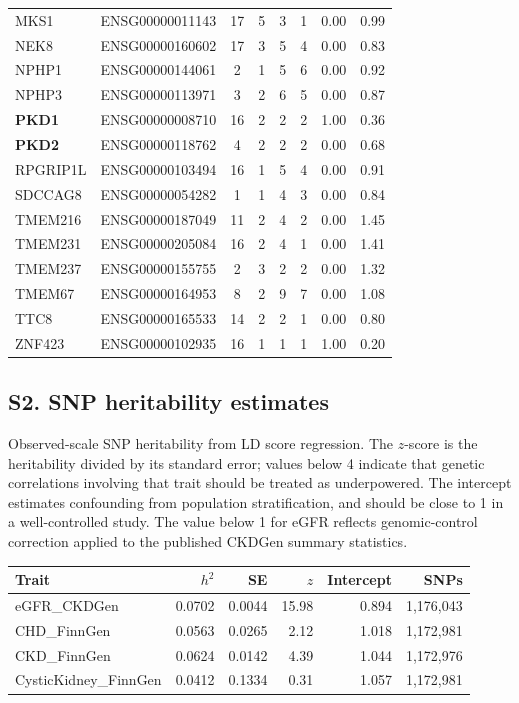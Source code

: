 \documentclass[11pt,a4paper]{article}
\begin{document}
\begin{longtable}{llccccrr}
MKS1 & ENSG00000011143 & 17 & 5 & 3 & 1 & 0.00 & 0.99 \\
NEK8 & ENSG00000160602 & 17 & 3 & 5 & 4 & 0.00 & 0.83 \\
NPHP1 & ENSG00000144061 & 2 & 1 & 5 & 6 & 0.00 & 0.92 \\
NPHP3 & ENSG00000113971 & 3 & 2 & 6 & 5 & 0.00 & 0.87 \\
\textbf{PKD1} & ENSG00000008710 & 16 & 2 & 2 & 2 & 1.00 & 0.36 \\
\textbf{PKD2} & ENSG00000118762 & 4 & 2 & 2 & 2 & 0.00 & 0.68 \\
RPGRIP1L & ENSG00000103494 & 16 & 1 & 5 & 4 & 0.00 & 0.91 \\
SDCCAG8 & ENSG00000054282 & 1 & 1 & 4 & 3 & 0.00 & 0.84 \\
TMEM216 & ENSG00000187049 & 11 & 2 & 4 & 2 & 0.00 & 1.45 \\
TMEM231 & ENSG00000205084 & 16 & 2 & 4 & 1 & 0.00 & 1.41 \\
TMEM237 & ENSG00000155755 & 2 & 3 & 2 & 2 & 0.00 & 1.32 \\
TMEM67 & ENSG00000164953 & 8 & 2 & 9 & 7 & 0.00 & 1.08 \\
TTC8 & ENSG00000165533 & 14 & 2 & 2 & 1 & 0.00 & 0.80 \\
ZNF423 & ENSG00000102935 & 16 & 1 & 1 & 1 & 1.00 & 0.20 \\
\bottomrule
\end{longtable}

\subsection*{S2. SNP heritability estimates}

Observed-scale SNP heritability from LD score regression. The $z$-score is the heritability
divided by its standard error; values below 4 indicate that genetic correlations involving
that trait should be treated as underpowered. The intercept estimates confounding from
population stratification, and should be close to 1 in a well-controlled study. The value
below 1 for eGFR reflects genomic-control correction applied to the published CKDGen summary
statistics.

\begin{table}[htbp]
\centering
\small
\begin{tabular}{lrrrrr}
\toprule
Trait & $h^2$ & SE & $z$ & Intercept & SNPs \\
\midrule
eGFR\_CKDGen & 0.0702 & 0.0044 & 15.98 & 0.894 & 1,176,043 \\
CHD\_FinnGen & 0.0563 & 0.0265 & 2.12 & 1.018 & 1,172,981 \\
CKD\_FinnGen & 0.0624 & 0.0142 & 4.39 & 1.044 & 1,172,976 \\
CysticKidney\_FinnGen & 0.0412 & 0.1334 & 0.31 & 1.057 & 1,172,981 \\
\bottomrule
\end{tabular}
\end{table}
\end{document}
